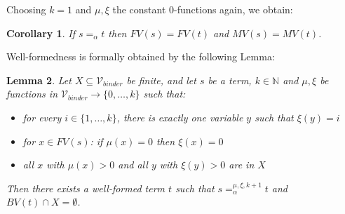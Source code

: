 \documentclass{lmcs}
\theoremstyle{theorem}\newtheorem{theorem}{Theorem}
\theoremstyle{theorem}\newtheorem{lemma}[theorem]{Lemma}
\theoremstyle{theorem}\newtheorem{corollary}[theorem]{Corollary}
\theoremstyle{definition}\newtheorem{definition}[theorem]{Definition}
\theoremstyle{definition}\newtheorem{example}[theorem]{Example}
\newcommand{\N}{\mathbb{N}}
\newcommand{\Vbound}{\mathcal{V}_{\mathit{binder}}}
\newcommand{\FV}{\mathit{FV}}
\newcommand{\FMV}{\mathit{MV}}
\newcommand{\BV}{\mathit{BV}}
\newcommand{\avar}{x}
\newcommand{\bvar}{y}
\begin{document}
Choosing $k = 1$ and $\mu,\xi$ the constant $0$-functions again, we obtain:

\begin{corollary}\label{corr:alphafreevar}
If $s =_\alpha t$ then $\FV(s) = \FV(t)$ and $\FMV(s) = \FMV(t)$.
\end{corollary}

Well-formedness is formally obtained by the following Lemma:

\begin{lemma}\label{lem:wellformedcounterpart}
Let $X \subseteq \Vbound$ be finite, and let $s$ be a term, $k \in \N$ and
$\mu,\xi$ be functions in $\Vbound \to \{0,\dots,k\}$ such that:
\begin{itemize}
\item for every $i \in \{1,\dots,k\}$, there is exactly one variable $\bvar$
  such that $\xi(\bvar) = i$
\item for $\avar \in \FV(s)$: if $\mu(\avar) = 0$ then $\xi(\avar) = 0$
\item all $\avar$ with $\mu(\avar) > 0$ and all $\bvar$ with $\xi(\bvar) > 0$
  are in $X$
\end{itemize}
Then there exists a well-formed term $t$ such that $s =_\alpha^{\mu,\xi,k+1} t$
and $\BV(t) \cap X = \emptyset$.
\end{lemma}
\end{document}
